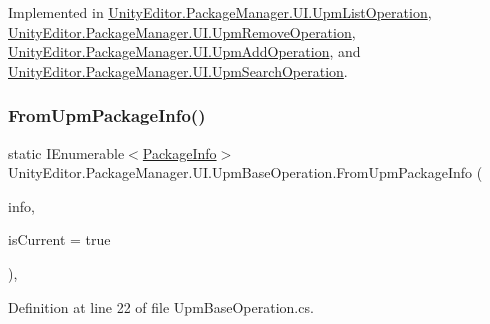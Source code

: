 Implemented in \mbox{\hyperlink{class_unity_editor_1_1_package_manager_1_1_u_i_1_1_upm_list_operation_a6bde4381207e9b9eb75c2d9bb40e412a}{Unity\+Editor.\+Package\+Manager.\+U\+I.\+Upm\+List\+Operation}}, \mbox{\hyperlink{class_unity_editor_1_1_package_manager_1_1_u_i_1_1_upm_remove_operation_acc7b7b33d5e447aebc7cb9545f39eefb}{Unity\+Editor.\+Package\+Manager.\+U\+I.\+Upm\+Remove\+Operation}}, \mbox{\hyperlink{class_unity_editor_1_1_package_manager_1_1_u_i_1_1_upm_add_operation_a5b4cbf090d82606a14caf9fd90ccd0c0}{Unity\+Editor.\+Package\+Manager.\+U\+I.\+Upm\+Add\+Operation}}, and \mbox{\hyperlink{class_unity_editor_1_1_package_manager_1_1_u_i_1_1_upm_search_operation_ac66ee3f7eb67d73713ed31c1560c50a2}{Unity\+Editor.\+Package\+Manager.\+U\+I.\+Upm\+Search\+Operation}}.

\mbox{\label{class_unity_editor_1_1_package_manager_1_1_u_i_1_1_upm_base_operation_a1b5f0339693904dce28d8a9935530fa8}} 
\subsubsection{\texorpdfstring{FromUpmPackageInfo()}{FromUpmPackageInfo()}}
{\footnotesize\ttfamily static I\+Enumerable$<$\mbox{\hyperlink{class_unity_editor_1_1_package_manager_1_1_u_i_1_1_package_info}{Package\+Info}}$>$ Unity\+Editor.\+Package\+Manager.\+U\+I.\+Upm\+Base\+Operation.\+From\+Upm\+Package\+Info (\begin{DoxyParamCaption}\item[{Package\+Manager.\+Package\+Info}]{info,  }\item[{bool}]{is\+Current = {\ttfamily true} }\end{DoxyParamCaption})\hspace{0.3cm}{\ttfamily [static]}, {\ttfamily [protected]}}



Definition at line 22 of file Upm\+Base\+Operation.\+cs.

\mbox{\label{class_unity_editor_1_1_package_manager_1_1_u_i_1_1_upm_base_operation_ac210057da378964fb9b69ddf919909c0}} 
